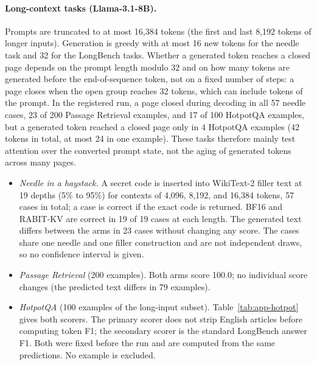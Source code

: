 \documentclass{article}
\begin{document}
\paragraph{Long-context tasks (Llama-3.1-8B).}
Prompts are truncated to at most 16,384 tokens (the first and last 8,192 tokens of longer inputs).
Generation is greedy with at most 16 new tokens for the needle task and 32 for the LongBench tasks.
Whether a generated token reaches a closed page depends on the prompt length modulo 32 and on how many
tokens are generated before the end-of-sequence token, not on a fixed number of steps: a page closes when
the open group reaches 32 tokens, which can include tokens of the prompt. In the registered run, a page
closed during decoding in all 57 needle cases, 23 of 200 Passage Retrieval examples, and 17 of 100
HotpotQA examples, but a generated token reached a closed page only in 4 HotpotQA examples (42 tokens in
total, at most 24 in one example). These tasks therefore mainly test attention over the converted
prompt state, not the aging of generated tokens across many pages.
\begin{itemize}
\item \emph{Needle in a haystack.} A secret code is inserted into WikiText-2 filler text at 19
  depths (5\% to 95\%) for contexts of 4,096, 8,192, and 16,384 tokens, 57 cases in total; a case is
  correct if the exact code is returned. BF16 and RABIT-KV are correct in 19 of 19 cases at each
  length. The generated text differs between the arms in 23 cases without changing any score. The
  cases share one needle and one filler construction and are not independent draws, so no confidence
  interval is given.
\item \emph{Passage Retrieval} (200 examples). Both arms score 100.0; no individual score changes
  (the predicted text differs in 79 examples).
\item \emph{HotpotQA} (100 examples of the long-input subset). Table~\ref{tab:app-hotpot} gives both
  scorers. The primary scorer does not strip English articles before computing token F1; the secondary
  scorer is the standard LongBench answer F1. Both were fixed before the run and are computed from the
  same predictions. No example is excluded.
\end{itemize}
\end{document}
